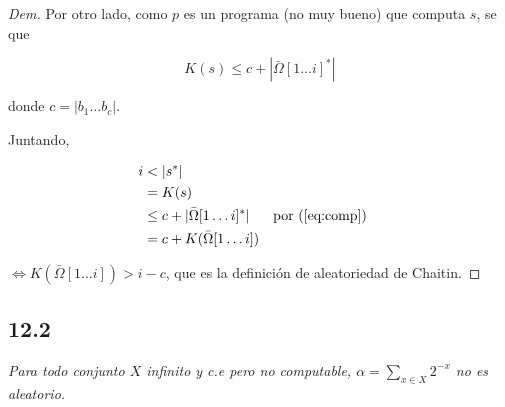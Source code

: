 \documentclass{article}
\theoremstyle{definition} %
\newcommand{\first}[2]{#2[1 \dots #1]}
\begin{document}
\begin{proof}[Dem]
    Por otro lado, como $p$ es un programa (no muy bueno) que computa $s$, se que

    \begin{equation}\label{eq:comp}
         K(s) \leq c + |\first{i}{\bar{\Omega}}^*|
    \end{equation}

    donde $c = |b_1 \dots b_c|$.

    Juntando,

    \begin{align*}
        i
            &< |s^*|\\
            &= K(s)\\
            &\leq c + |\first{i}{\bar{\Omega}}^*| &&\text{por (\ref{eq:comp})}\\
            &= c + K(\first{i}{\bar{\Omega}})
    \end{align*}

    $\iff K(\first{i}{\bar{\Omega}}) > i - c$, que es la definición de
    aleatoriedad de Chaitin.

\end{proof}

\subsection*{12.2}

\textit{Para todo conjunto $X$ infinito y c.e pero no computable, $\alpha =
\sum_{x \in X} 2^{-x}$ no es aleatorio.}
\end{document}
